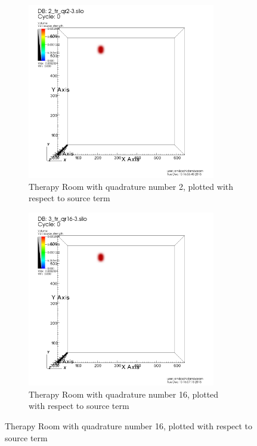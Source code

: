 \documentclass[10pt]{article}
\begin{document}
\begin{figure}[!ht]
\begin{subfigure}{0.49\textwidth}
\includegraphics[width = 0.9\textwidth]{visit/source-term-treatment-room-02}
\caption{Therapy Room with quadrature number 2, plotted with respect to source term}
\label{visit:source-term-treatment-room-02}
\end{subfigure}
\hfill
\begin{subfigure}{0.49\textwidth}
\includegraphics[width = 0.9\textwidth]{visit/source-term-treatment-room-16}
\caption{Therapy Room with quadrature number 16, plotted with respect to source term}
\label{visit:source-term-treatment-room-16}
\end{subfigure}
\end{figure}
\end{document}
